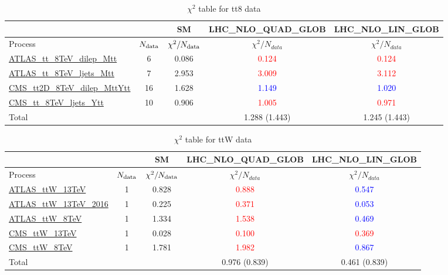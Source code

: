 \documentclass{article}
\begin{document}
\begin{table}[H]
\centering
\begin{tabular}{|l|c|c|c|c|}
\hline
 \multicolumn{2}{|c|}{} & SM& LHC_NLO_QUAD_GLOB& LHC_NLO_LIN_GLOB\\ \hline
Process & $N_{\rm data}$ & $\chi^ 2/N_{\rm data}$& $\chi^ 2/N_{data}$& $\chi^ 2/N_{data}$\\ \hline
\href{https://arxiv.org}{ATLAS_tt_8TeV_dilep_Mtt} & 6 & 0.086 & \textcolor{red}                            {0.124} & \textcolor{red}                            {0.124} \\ \hline
\href{https://arxiv.org}{ATLAS_tt_8TeV_ljets_Mtt} & 7 & 2.953 & \textcolor{red}                            {3.009} & \textcolor{red}                            {3.112} \\ \hline
\href{https://arxiv.org}{CMS_tt2D_8TeV_dilep_MttYtt} & 16 & 1.628 & \textcolor{blue}                            {1.149} & \textcolor{blue}                            {1.020} \\ \hline
\href{https://arxiv.org}{CMS_tt_8TeV_ljets_Ytt} & 10 & 0.906 & \textcolor{red}                            {1.005} & \textcolor{red}                            {0.971} \\ \hline
\hline Total & &  & 1.288 (1.443) & 1.245 (1.443) \\ \hline
\end{tabular}
\caption{$\chi^2$ table for tt8 data}
\end{table}
\begin{table}[H]
\centering
\begin{tabular}{|l|c|c|c|c|}
\hline
 \multicolumn{2}{|c|}{} & SM& LHC_NLO_QUAD_GLOB& LHC_NLO_LIN_GLOB\\ \hline
Process & $N_{\rm data}$ & $\chi^ 2/N_{\rm data}$& $\chi^ 2/N_{data}$& $\chi^ 2/N_{data}$\\ \hline
\href{https://arxiv.org}{ATLAS_ttW_13TeV} & 1 & 0.828 & \textcolor{red}                            {0.888} & \textcolor{blue}                            {0.547} \\ \hline
\href{https://arxiv.org}{ATLAS_ttW_13TeV_2016} & 1 & 0.225 & \textcolor{red}                            {0.371} & \textcolor{blue}                            {0.053} \\ \hline
\href{https://arxiv.org}{ATLAS_ttW_8TeV} & 1 & 1.334 & \textcolor{red}                            {1.538} & \textcolor{blue}                            {0.469} \\ \hline
\href{https://arxiv.org}{CMS_ttW_13TeV} & 1 & 0.028 & \textcolor{red}                            {0.100} & \textcolor{red}                            {0.369} \\ \hline
\href{https://arxiv.org}{CMS_ttW_8TeV} & 1 & 1.781 & \textcolor{red}                            {1.982} & \textcolor{blue}                            {0.867} \\ \hline
\hline Total & &  & 0.976 (0.839) & 0.461 (0.839) \\ \hline
\end{tabular}
\caption{$\chi^2$ table for ttW data}
\end{table}
\end{document}
